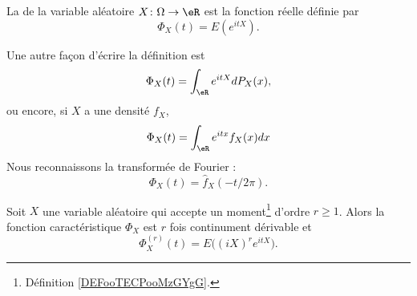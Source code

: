 \begin{definition}      \label{DefooEIVXooNtHLQQ}
	La  de la variable aléatoire \( X\colon \Omega\to \eR\) est la fonction réelle définie par
	\begin{equation}
		\Phi_X(t)=E( e^{itX}).
	\end{equation}
\end{definition}
Une autre façon d'écrire la définition est
\begin{equation}
	\Phi_X(t)=\int_{\eR} e^{itX}dP_X(x),
\end{equation}
ou encore, si \( X\) a une densité \( f_X\),
\begin{equation}        \label{EqFnCaractfncadens}
	\Phi_X(t)=\int_{\eR} e^{itx}f_X(x)dx
\end{equation}
Nous reconnaissons la transformée de Fourier :
\begin{equation}
	\Phi_X(t)=\hat f_X(-t/2\pi).
\end{equation}

\begin{proposition}     \label{PropDerFnCaract}
	Soit \( X\) une variable aléatoire qui accepte un moment\footnote{Définition \ref{DEFooTECPooMzGYgG}.} d'ordre \( r\geq 1\). Alors la fonction caractéristique \( \Phi_X\) est \( r\) fois continument dérivable et
	\begin{equation}		\label{EQooVOZTooFDkWjd}
		\Phi_X^{(r)}(t)=E\big( (iX)^r e^{itX} \big).
	\end{equation}
\end{proposition}

